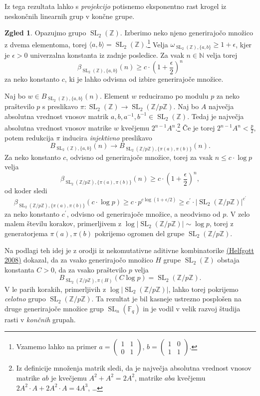 \documentclass[11pt]{book}
\def\NN{\mathbb{N}}
\def\ZZ{\mathbb{Z}}
\def\field{\mathbb{F}}
\DeclareMathOperator\SL{SL}
\theoremstyle{definition}
\theoremstyle{zgled}
\newtheorem*{zgled}{Zgled}
\theoremstyle{odprtproblem}
\theoremstyle{domacanaloga}
\theoremstyle{izrek}
\begin{document}
Iz tega rezultata lahko s {\em projekcijo} potisnemo eksponentno rast krogel iz neskončnih linearnih grup v končne grupe. 

\begin{zgled}
Opazujmo grupo $\SL_2(\ZZ)$. Izberimo neko njeno generirajočo množico z dvema elementoma, torej $\langle a,b \rangle = \SL_2(\ZZ)$.\footnote{Vzamemo lahko na primer $a = \left( \begin{smallmatrix} 1 & 1 \\ 0 & 1 \end{smallmatrix} \right)$, $b = \left( \begin{smallmatrix} 1 & 0 \\ 1 & 1 \end{smallmatrix} \right)$.} Velja $\omega_{\SL_2(\ZZ), \{a,b\}} \geq 1 + \epsilon$, kjer je $\epsilon > 0$ univerzalna konstanta iz zadnje posledice. Za vsak $n \in \NN$ velja torej
\[
\beta_{\SL_2(\ZZ), \{ a, b \}}(n) \geq c \cdot \left( 1 + \frac{\epsilon}{2} \right)^n
\]
za neko konstanto $c$, ki je lahko odvisna od izbire generirajoče množice.

Naj bo $w \in B_{\SL_2(\ZZ), \{ a, b \}}(n)$. Element $w$ reduciramo po modulu $p$ za neko praštevilo $p$ s preslikavo $\pi \colon \SL_2(\ZZ) \to \SL_2(\ZZ/p\ZZ)$. Naj bo $A$ največja absolutna vrednost vnosov matrik $a,b,a^{-1},b^{-1} \in \SL_2(\ZZ)$. Tedaj je največja absolutna vrednost vnosov matrike $w$ kvečjemu $2^{n-1} A^n$.\footnote{Iz definicije množenja matrik sledi, da je največja absolutna vrednost vnosov matrike $ab$ je kvečjemu $A^2 + A^2 = 2 A^2$, matrike $aba$ kvečjemu $2A^2 \cdot A + 2A^2 \cdot A = 4 A^3$, \dots} Če je torej $2^{n-1} A^n < \frac{p}{2}$, potem redukcija $\pi$ inducira {\em injektivno} preslikavo
\[
B_{\SL_2(\ZZ), \{a,b\}}(n) \to B_{\SL_2(\ZZ/p\ZZ), \{ \pi(a),\pi(b) \}}(n).
\]
Za neko konstanto $c$, odvisno od generirajoče množice, torej za vsak $n \leq c \cdot \log p$ velja
\[
\beta_{\SL_2(\ZZ/p\ZZ), \{ \pi(a), \pi(b) \}}(n) \geq c \cdot \left( 1 + \frac{\epsilon}{2} \right)^n,
\]
od koder sledi
\[
\beta_{\SL_2(\ZZ/p\ZZ), \{ \pi(a), \pi(b) \}}(c \cdot \log p) \geq c \cdot p^{c \log (1 + \epsilon/2)} \geq c^{\prime} \cdot |\SL_2(\ZZ/p\ZZ)|^{c^{\prime}}
\]
za neko konstanto $c^\prime$, odvisno od generirajoče množice, a neodvisno od $p$. V zelo malem številu korakov, primerljivem z $\log |\SL_2(\ZZ/p\ZZ)| \sim \log p$, torej z generatorjema $\pi(a), \pi(b)$ pokrijemo ogromen del grupe $\SL_2(\ZZ/p\ZZ)$.

Na podlagi teh idej je z orodji iz nekomutativne aditivne kombinatorike \href{https://annals.math.princeton.edu/2008/167-2/p06}{(Helfgott 2008)} dokazal, da za vsako generirajočo množico $H$ grupe $\SL_2(\ZZ)$ obstaja konstanta $C > 0$, da za vsako praštevilo $p$ velja 
\[
B_{\SL_2(\ZZ/p\ZZ), \pi(H)}(C \log p) = \SL_2(\ZZ/p\ZZ).
\]
V le parih korakih, primerljivih z $\log |\SL_2(\ZZ/p\ZZ)|$, lahko torej pokrijemo {\em celotno} grupo $\SL_2(\ZZ/p\ZZ)$. Ta rezultat je bil kasneje ustrezno posplošen na druge generirajoče množice grup $\SL_n(\field_q)$ in je vodil v velik razvoj študija rasti v {\em končnih} grupah.
\end{zgled}
\end{document}
